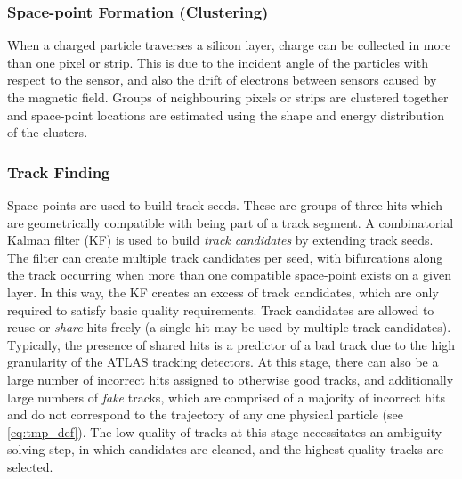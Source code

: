 
\subsubsection{Space-point Formation (Clustering)}
When a charged particle traverses a silicon layer, charge can be collected in more than one pixel or strip.
This is due to the incident angle of the particles with respect to the sensor, and also the drift of electrons between sensors caused by the magnetic field.
Groups of neighbouring pixels or strips are clustered together and space-point locations are estimated using the shape and energy distribution of the clusters.

\subsubsection{Track Finding}
Space-points are used to build track seeds. These are groups of three hits which are geometrically compatible with being part of a track segment.
A combinatorial Kalman filter (KF) is used to build \textit{track candidates} by extending track seeds.
The filter can create multiple track candidates per seed, with bifurcations along the track occurring when more than one compatible space-point exists on a given layer.
In this way, the KF creates an excess of track candidates, which are only required to satisfy basic quality requirements. 
Track candidates are allowed to reuse or \textit{share} hits freely (a single hit may be used by multiple track candidates).
Typically, the presence of shared hits is a predictor of a bad track due to the high granularity of the ATLAS tracking detectors.
At this stage, there can also be a large number of incorrect hits assigned to otherwise good tracks, and additionally large numbers of \textit{fake} tracks, which are comprised of a majority of incorrect hits and do not correspond to the trajectory of any one physical particle (see \cref{eq:tmp_def}).
The low quality of tracks at this stage necessitates an ambiguity solving step, in which candidates are cleaned, and the highest quality tracks are selected.

